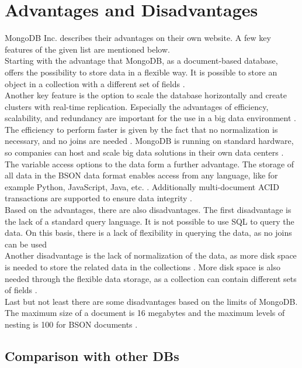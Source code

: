
\section{Advantages and Disadvantages}

MongoDB Inc. describes their advantages on their own website. A few key features of the given list are mentioned below.
\\
Starting with the advantage that MongoDB, as a document-based database, offers the possibility to store data in a flexible way.
It is possible to store an object in a collection with a different set of fields \parencite{Mongo-Advantages}.
\\
Another key feature is the option to scale the database horizontally and create clusters with real-time replication.
Especially the advantages of efficiency, scalability, and redundancy are important for the use in a big data environment \parencite{Mongo-Advantages}.
The efficiency to perform faster is given by the fact that no normalization is necessary, and no joins are needed \parencite[p. 2]{Cottrell2020}.
MongoDB is running on standard hardware, so companies can host and scale big data solutions in their own data centers \parencite[p. 1]{Cottrell2020}.
\\
The variable access options to the data form a further advantage. The storage of all data in the BSON data format enables access from any language, like for example
Python, JavaScript, Java, etc. \parencite{Mongo-Advantages}.
Additionally multi-document ACID transactions are supported to ensure data integrity \parencite{Mongo-ACID}.
\\
Based on the advantages, there are also disadvantages. The first disadvantage is the lack of a standard query language.
It is not possible to use SQL to query the data. On this basis, there is a lack of flexibility in querying the data, as no joins can be used \parencite{Mongo-Advantages}
\\
Another disadvantage is the lack of normalization of the data, as more disk space is needed to store the related data in the collections \parencite[p. 2]{Cottrell2020}.
More disk space is also needed through the flexible data storage, as a collection can contain different sets of fields \parencite{Mongo-Advantages}.
\\
Last but not least there are some disadvantages based on the limits of MongoDB. The maximum size of a document is 16 megabytes
and the maximum levels of nesting is 100 for BSON documents \parencite{Mongo-Limits}.


\subsection{Comparison with other DBs}

